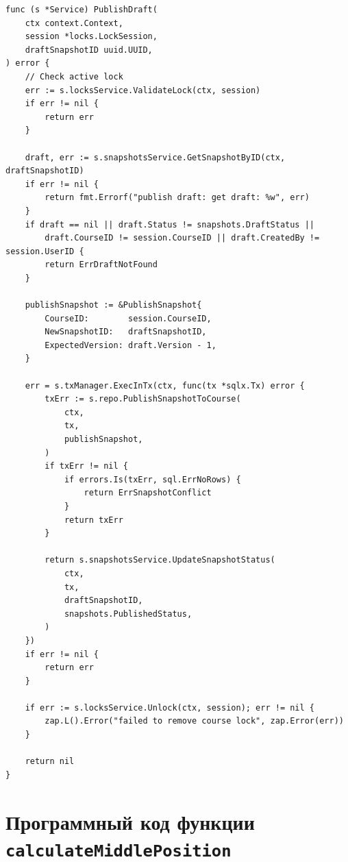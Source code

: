 \documentclass[coursework]{SCWorks}
\begin{document}
\begin{verbatim}
func (s *Service) PublishDraft(
	ctx context.Context,
	session *locks.LockSession,
	draftSnapshotID uuid.UUID,
) error {
	// Check active lock
	err := s.locksService.ValidateLock(ctx, session)
	if err != nil {
		return err
	}

	draft, err := s.snapshotsService.GetSnapshotByID(ctx, draftSnapshotID)
	if err != nil {
		return fmt.Errorf("publish draft: get draft: %w", err)
	}
	if draft == nil || draft.Status != snapshots.DraftStatus ||
		draft.CourseID != session.CourseID || draft.CreatedBy != session.UserID {
		return ErrDraftNotFound
	}

	publishSnapshot := &PublishSnapshot{
		CourseID:        session.CourseID,
		NewSnapshotID:   draftSnapshotID,
		ExpectedVersion: draft.Version - 1,
	}

	err = s.txManager.ExecInTx(ctx, func(tx *sqlx.Tx) error {
		txErr := s.repo.PublishSnapshotToCourse(
			ctx,
			tx,
			publishSnapshot,
		)
		if txErr != nil {
			if errors.Is(txErr, sql.ErrNoRows) {
				return ErrSnapshotConflict
			}
			return txErr
		}

		return s.snapshotsService.UpdateSnapshotStatus(
			ctx,
			tx,
			draftSnapshotID,
			snapshots.PublishedStatus,
		)
	})
	if err != nil {
		return err
	}

	if err := s.locksService.Unlock(ctx, session); err != nil {
		zap.L().Error("failed to remove course lock", zap.Error(err))
	}

	return nil
}
\end{verbatim}

\section{Программный код функции \texttt{calculateMiddlePosition}}
\end{document}
